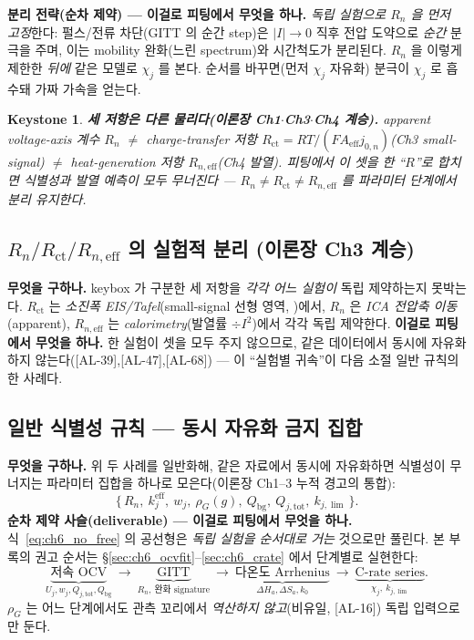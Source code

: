 \documentclass[11pt,a4paper]{article}
\newtheorem*{keybox}{Keystone}
\newcommand{\eff}{\mathrm{eff}}
\newcommand{\bg}{\mathrm{bg}}
\newcommand{\tot}{\mathrm{tot}}
\newcommand{\ct}{\mathrm{ct}}
\newcommand{\AL}[1]{\textsf{[AL-#1]}}
\begin{document}
\textbf{분리 전략(순차 제약) — 이걸로 피팅에서 무엇을 하나.} \emph{독립 실험으로 $R_n$ 을 먼저 고정}한다:
펄스/전류 차단(GITT 의 순간 step)은 $|I|\to0$ 직후 전압 도약으로 \emph{순간} 분극을 주며, 이는 mobility
완화(느린 spectrum)와 시간척도가 분리된다. $R_n$ 을 이렇게 제한한 \emph{뒤에} 같은 모델로 $\chi_j$ 를 본다.
순서를 바꾸면(먼저 $\chi_j$ 자유화) 분극이 $\chi_j$ 로 흡수돼 가짜 가속을 얻는다.
\begin{keybox}
\textbf{세 저항은 다른 물리다(이론장 Ch1$\cdot$Ch3$\cdot$Ch4 계승).} apparent voltage-axis 계수 $R_n$ $\ne$ charge-transfer
저항 $R_\ct=RT/(FA_\eff j_{0,n})$(Ch3 small-signal) $\ne$ heat-generation 저항 $R_{n,\eff}$(Ch4 발열). 피팅에서
이 셋을 한 ``$R$''로 합치면 식별성과 발열 예측이 모두 무너진다 — \textbf{$R_n\ne R_\ct\ne R_{n,\eff}$} 를
파라미터 단계에서 분리 유지한다.
\end{keybox}

\subsection{$R_n/R_\ct/R_{n,\eff}$ 의 실험적 분리 (이론장 Ch3 계승)}\label{sec:ch6_threeR}
\textbf{무엇을 구하나.} keybox 가 구분한 세 저항을 \emph{각각 어느 실험이} 독립 제약하는지 못박는다. $R_\ct$ 는
\emph{소진폭 EIS/Tafel}(small-signal 선형 영역, \cite{bardfaulkner})에서, $R_n$ 은 \emph{ICA 전압축
이동}(apparent), $R_{n,\eff}$ 는 \emph{calorimetry}(발열률 $\div I^2$)에서 각각 독립 제약한다.
\textbf{이걸로 피팅에서 무엇을 하나.} 한 실험이 셋을 모두 주지 않으므로, 같은 데이터에서 동시에 자유화하지
않는다(\AL{39},\AL{47},\AL{68}) — 이 ``실험별 귀속''이 다음 소절 일반 규칙의 한 사례다.

\subsection{일반 식별성 규칙 — 동시 자유화 금지 집합}\label{sec:ch6_noFree}
\textbf{무엇을 구하나.} 위 두 사례를 일반화해, 같은 자료에서 동시에 자유화하면 식별성이 무너지는 파라미터 집합을
하나로 모은다(이론장 Ch1--3 누적 경고의 통합):
\begin{equation}
\{\,R_n,\ k_j^{\eff},\ w_j,\ \rho_G(g),\ Q_\bg,\ Q_{j,\tot},\ k_{j,\lim}\,\}.
\label{eq:ch6_no_free}
\end{equation}
\textbf{순차 제약 사슬(deliverable) — 이걸로 피팅에서 무엇을 하나.} 식~\eqref{eq:ch6_no_free} 의 공선형은
\emph{독립 실험을 순서대로 거는} 것으로만 풀린다. 본 부록의 권고 순서는 \S\ref{sec:ch6_ocvfit}--\ref{sec:ch6_crate}
에서 단계별로 실현한다:
\[
\underbrace{\text{저속 OCV}}_{U_j,w_j,Q_{j,\tot},Q_\bg}\ \to\ \underbrace{\text{GITT}}_{R_n,\ \text{완화 signature}}\ \to\
\underbrace{\text{다온도 Arrhenius}}_{\Delta H_a,\Delta S_a,k_0}\ \to\ \underbrace{\text{C-rate series}}_{\chi_j,\ k_{j,\lim}}.
\]
$\rho_G$ 는 어느 단계에서도 관측 꼬리에서 \emph{역산하지 않고}(비유일, \AL{16}) 독립 입력으로만 둔다.
\end{document}
